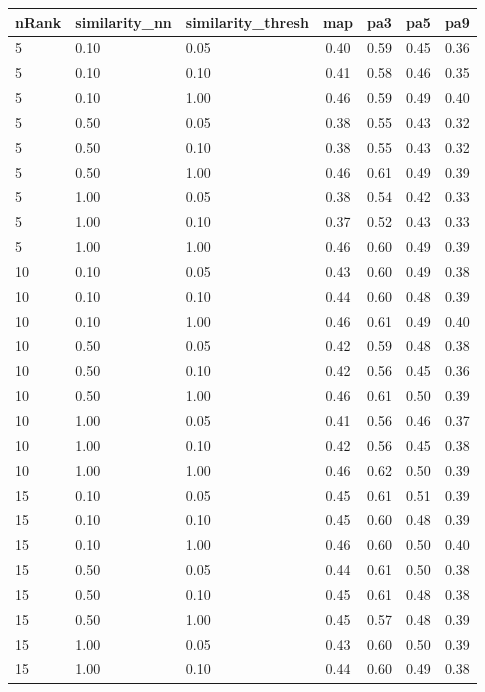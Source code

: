 \documentclass[12pt,a4paper,fleqn]{tufte-handout}
\begin{document}
  
\begin{table} 
\begin{center} 
\scriptsize 
 \setlength{\tabcolsep}{.16667em} 
\begin{tabular}{lllcccc} 
nRank & similarity\_nn & similarity\_thresh & map & pa3 & pa5 & pa9 \\ 
\hline 
 5 & 0.10 & 0.05 & 0.40 & 0.59 & 0.45 & 0.36 \\ 
 5 & 0.10 & 0.10 & 0.41 & 0.58 & 0.46 & 0.35 \\ 
 5 & 0.10 & 1.00 & 0.46 & 0.59 & 0.49 & 0.40 \\ 
 5 & 0.50 & 0.05 & 0.38 & 0.55 & 0.43 & 0.32 \\ 
 5 & 0.50 & 0.10 & 0.38 & 0.55 & 0.43 & 0.32 \\ 
 5 & 0.50 & 1.00 & 0.46 & 0.61 & 0.49 & 0.39 \\ 
 5 & 1.00 & 0.05 & 0.38 & 0.54 & 0.42 & 0.33 \\ 
 5 & 1.00 & 0.10 & 0.37 & 0.52 & 0.43 & 0.33 \\ 
 5 & 1.00 & 1.00 & 0.46 & 0.60 & 0.49 & 0.39 \\ 
10 & 0.10 & 0.05 & 0.43 & 0.60 & 0.49 & 0.38 \\ 
10 & 0.10 & 0.10 & 0.44 & 0.60 & 0.48 & 0.39 \\ 
10 & 0.10 & 1.00 & 0.46 & 0.61 & 0.49 & 0.40 \\ 
10 & 0.50 & 0.05 & 0.42 & 0.59 & 0.48 & 0.38 \\ 
10 & 0.50 & 0.10 & 0.42 & 0.56 & 0.45 & 0.36 \\ 
10 & 0.50 & 1.00 & 0.46 & 0.61 & 0.50 & 0.39 \\ 
10 & 1.00 & 0.05 & 0.41 & 0.56 & 0.46 & 0.37 \\ 
10 & 1.00 & 0.10 & 0.42 & 0.56 & 0.45 & 0.38 \\ 
10 & 1.00 & 1.00 & 0.46 & 0.62 & 0.50 & 0.39 \\ 
15 & 0.10 & 0.05 & 0.45 & 0.61 & 0.51 & 0.39 \\ 
15 & 0.10 & 0.10 & 0.45 & 0.60 & 0.48 & 0.39 \\ 
15 & 0.10 & 1.00 & 0.46 & 0.60 & 0.50 & 0.40 \\ 
15 & 0.50 & 0.05 & 0.44 & 0.61 & 0.50 & 0.38 \\ 
15 & 0.50 & 0.10 & 0.45 & 0.61 & 0.48 & 0.38 \\ 
15 & 0.50 & 1.00 & 0.45 & 0.57 & 0.48 & 0.39 \\ 
15 & 1.00 & 0.05 & 0.43 & 0.60 & 0.50 & 0.39 \\ 
15 & 1.00 & 0.10 & 0.44 & 0.60 & 0.49 & 0.38 \\ 

\end{tabular}
\end{center}
\end{table}
\end{document}
